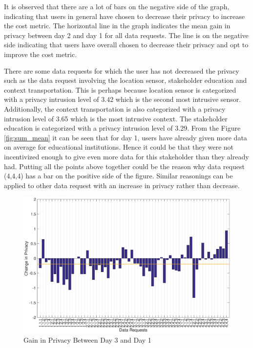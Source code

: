 It is observed that there are a lot of bars on the negative side of the graph, indicating that users in general have chosen to decrease their privacy to increase the cost metric. The horizontal line in the graph indicates the mean gain in privacy between day 2 and day 1 for all data requests. The line is on the negative side indicating that users have overall chosen to decrease their privacy and opt to improve the cost metric. 

There are some data requests for which the user has not decreased the privacy such as the data request involving the location sensor, stakeholder education and context transportation. This is perhaps because location sensor is categorized with a privacy intrusion level of 3.42 which is the second most intrusive sensor. Additionally, the context transportation is also categorized with a privacy intrusion level of 3.65 which is the most intrusive context. The stakeholder education is categorized with a privacy intrusion level of 3.29. From the Figure \ref{fig:sum_mean} it can be seen that for day 1, users have already given more data on average for educational institutions. Hence it could be that they were not incentivized enough to give even more data for this stakeholder than they already had. Putting all the points above together could be the reason why data request (4,4,4) has a bar on the positive side of the figure. Similar reasonings can be applied to other data request with an increase in privacy rather than decrease.

\begin{figure}[ht!]
\centering
\includegraphics[width=\textwidth]{./images/day3_day1}
\caption{Gain in Privacy Between Day 3 and Day 1}
\label{fig:day3_day1}
\end{figure}

